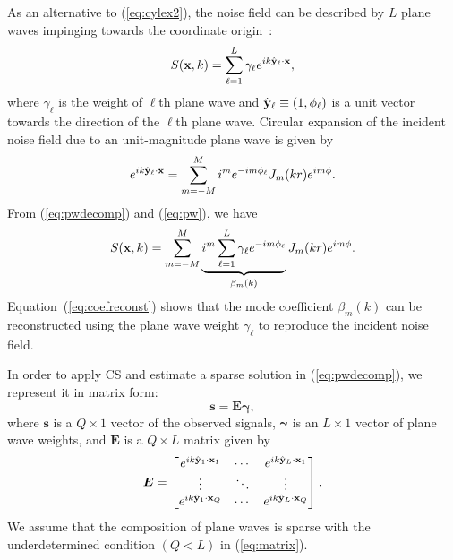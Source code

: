 \documentclass{article}
\begin{document}
As an alternative to (\ref{eq:cylex2}), the noise field can be described by
$L$ plane waves impinging towards the coordinate origin~\cite{fan2014practical}:
%
\begin{equation}
S({\bf x}, k) = \sum^{L}_{\ell=1} \gamma_\ell e^{ik \hat{ {\bf y}}_\ell \cdot {\bf x}} ,
\label{eq:pwdecomp}
\end{equation}
%
where $\gamma_\ell$ is the weight of $\ell$th plane wave and $\hat{ {\bf y}}_\ell \equiv (1, \phi_\ell)$ is a
unit vector towards the direction of the $\ell$th plane wave.
Circular expansion of the incident noise field due to an unit-magnitude plane wave is given by
%
\begin{equation}
e^{ik \hat{ {\bf y}}_\ell \cdot {\bf x}} = \sum^M_{m=-M} i^m e^{-im \phi_\ell} J_m(kr) e^{im \phi} .
\label{eq:pw}
\end{equation}
%
From (\ref{eq:pwdecomp}) and (\ref{eq:pw}), we have
%
\begin{equation}
S({\bf x}, k) = \sum^M_{m=-M} \underbrace{ i^m \sum^{L}_{\ell=1} \gamma_\ell e^{-im \phi_\ell} }_{\beta_m(k)} J_m(kr) e^{im \phi} .
\label{eq:coefreconst}
\end{equation}
%
Equation~(\ref{eq:coefreconst}) shows that the mode coefficient $\beta_m(k)$ can be reconstructed using the plane wave weight $\gamma_\ell$
to reproduce the incident noise field.

In order to apply CS and estimate a sparse solution
in (\ref{eq:pwdecomp}),
we represent it in matrix form:
%
\begin{equation}
\bm{s} = \bm{E} \bm{\gamma} ,
\label{eq:matrix}
\end{equation}
%
where $\bm{s}$ is a $Q \times 1$ vector of the observed signals, $\bm{\gamma}$ is an $L \times 1$ vector of plane wave weights, and $\bm{E}$ is a
$Q \times L$ matrix given by
%
\begin{equation}
\bm{E} = 
\begin{bmatrix}
e^{ik \hat{ {\bf y}}_1 \cdot {\bf x}_1} & \cdots & e^{ik \hat{ {\bf y}}_L \cdot {\bf x}_1} \\
\vdots & \ddots & \vdots \\
e^{ik \hat{ { \bf y}}_1 \cdot {\bf x}_Q} & \cdots & e^{ik \hat{ {\bf y}}_L \cdot {\bf x}_Q}
\end{bmatrix}
.
\label{eq:matE}
\end{equation}
%
We assume that the composition of plane waves is sparse with the underdetermined condition $(Q<L)$ in (\ref{eq:matrix}).
\end{document}
